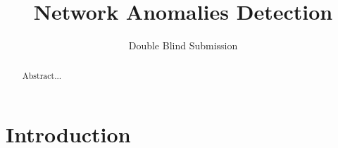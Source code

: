 \documentclass{sig-alternate}
\begin{document}

\title{Network Anomalies Detection}


\author{
	\alignauthor
	Double Blind Submission
%
}

\maketitle

\begin{abstract}
Abstract...
\end{abstract}



\section{Introduction}
\end{document}
